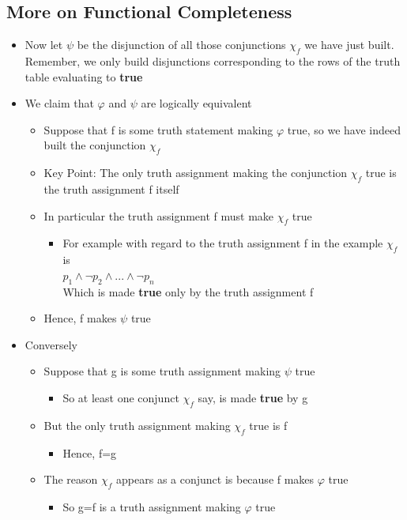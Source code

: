 \documentclass{article}[18pt]
\begin{document}
\subsection{More on Functional Completeness}
\begin{itemize}
\item Now let $\psi$ be the disjunction of all those conjunctions $\chi_f$ we have just built. Remember, we only build disjunctions corresponding to the rows of the truth table evaluating to \textbf{true}
\item We claim that $\varphi$ and $\psi$ are logically equivalent
\begin{itemize}
\item Suppose that f is some truth statement making $\varphi$ true, so we have indeed built the conjunction $\chi_f$
\item Key Point: The only truth assignment making the conjunction $\chi_f$ true is the truth assignment f itself
\item In particular the truth assignment f must make $\chi_f$ true
\begin{itemize}
\item For example with regard to the truth assignment f in the example $\chi_f$ is\\ $p_1\land \lnot p_2 \land ... \land \lnot p_n$\\
Which is made \textbf{true} only by the truth assignment f
\end{itemize}
\item Hence, f makes $\psi$ true
\end{itemize}


\item Conversely
\begin{itemize}
\item Suppose that g is some truth assignment making $\psi$ true
\begin{itemize}
\item So at least one conjunct $\chi_f$ say, is made \textbf{true} by g
\end{itemize}
\item But the only truth assignment making $\chi_f$ true is f
\begin{itemize}
\item Hence, f=g
\end{itemize}
\item The reason $\chi_f$ appears as a conjunct is because f makes $\varphi$ true
\begin{itemize}
\item So g=f is a truth assignment making $\varphi$ true
\end{itemize}
\end{itemize}


\end{itemize}
\end{document}
